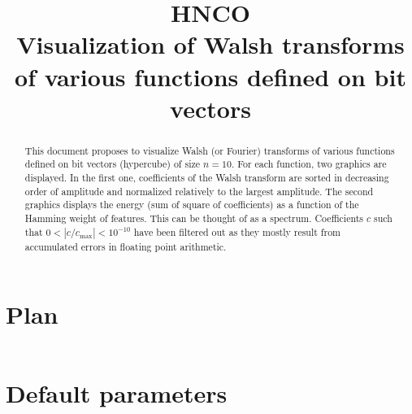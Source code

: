 \documentclass[a4paper]{article}
\begin{document}

\title{HNCO\\
  Visualization of Walsh transforms\\
  of various functions defined on bit vectors}
\maketitle

\begin{abstract}
  This document proposes to visualize Walsh (or Fourier) transforms of
  various functions defined on bit vectors (hypercube) of size
  $n=10$. For each function, two graphics are displayed. In the first
  one, coefficients of the Walsh transform are sorted in decreasing
  order of amplitude and normalized relatively to the largest
  amplitude. The second graphics displays the energy (sum of square of
  coefficients) as a function of the Hamming weight of features. This
  can be thought of as a spectrum. Coefficients $c$ such that
  $0 < |c/c_{\max}| < 10^{-10}$ have been filtered out as they mostly
  result from accumulated errors in floating point arithmetic.
\end{abstract}

\tableofcontents



\appendix

\section{Plan}

\inputminted[breaklines=true]{json}{../plan-compact.json}

\section{Default parameters}

\inputminted[breaklines=true]{text}{../log.defaults}
\end{document}
